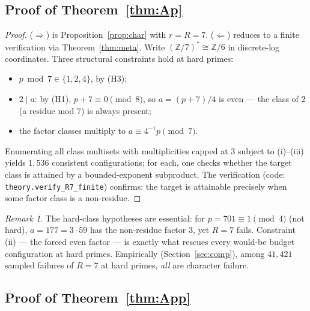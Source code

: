 \documentclass[11pt]{article}
\theoremstyle{plain}
\theoremstyle{remark}
\newtheorem{remark}[theorem]{Remark}
\theoremstyle{plain}
\numberwithin{equation}{section}
\begin{document}
\subsection{Proof of Theorem~\ref{thm:Ap}}

\begin{proof}
($\Rightarrow$) is Proposition~\ref{prop:char} with $r = R = 7$.
($\Leftarrow$) reduces to a finite verification via
Theorem~\ref{thm:meta}. Write $(\mathbb{Z}/7)^* \cong \mathbb{Z}/6$ in
discrete-log coordinates. Three structural constraints hold at hard
primes:
\begin{itemize}
\item[(i)] $p \bmod 7 \in \{1, 2, 4\}$, by (H3);
\item[(ii)] $2 \mid a$: by (H1), $p + 7 \equiv 0 \pmod 8$, so $a = (p+7)/4$
  is even --- the class of $2$ (a residue mod $7$) is always present;
\item[(iii)] the factor classes multiply to $a \equiv 4^{-1} p \pmod 7$.
\end{itemize}
Enumerating all class multisets with multiplicities capped at $3$
subject to (i)--(iii) yields $1{,}536$ consistent configurations; for each,
one checks whether the target class is attained by a bounded-exponent
subproduct. The verification (code: \texttt{theory.verify\_R7\_finite})
confirms: the target is attainable precisely when some factor class is a
non-residue.
\end{proof}

\begin{remark}
The hard-class hypotheses are essential: for $p = 701 \equiv 1 \pmod 4$
(not hard), $a = 177 = 3 \cdot 59$ has the non-residue factor $3$, yet
$R = 7$ fails. Constraint (ii) --- the forced even factor --- is exactly
what rescues every would-be budget configuration at hard primes.
Empirically (Section~\ref{sec:comp}), among $41{,}421$ sampled failures of
$R=7$ at hard primes, \emph{all} are character failure.
\end{remark}

\subsection{Proof of Theorem~\ref{thm:App}}
\end{document}
